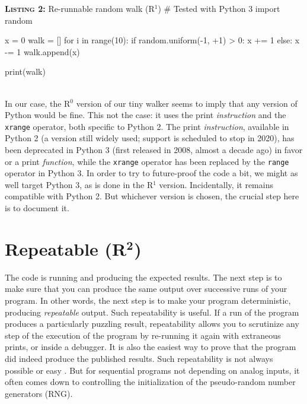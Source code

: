 \documentclass[a4paper,11pt]{article}
\begin{document}
\noindent \begin{minipage}[c]{\linewidth}
\begin{code}{\textbf{\textsc{Listing 2:}} Re-runnable random walk (R$^1$)}
# Tested with Python 3
import random

x =  0
walk = []
for i in range(10):
    if random.uniform(-1, +1) > 0:
        x += 1
    else:
        x -= 1
    walk.append(x)

print(walk)
\end{code}
\end{minipage}\\

In our case, the R$^0$ version of our tiny walker seems to imply that any version of Python would be fine. This not the case: it uses the print {\em instruction} and the {\tt xrange} operator, both specific to Python 2. The print {\em instruction}, available in Python 2 (a version still widely used; support is scheduled to stop in 2020), has been deprecated in Python 3 (first released in 2008, almost a decade ago) in favor or a  print {\em function}, while the {\tt xrange} operator has been replaced by the {\tt range} operator in Python 3. In order to try to future-proof the code a bit, we might as well target Python 3, as is done in the R$^1$ version. Incidentally, it remains compatible with Python 2. But whichever version is chosen, the crucial step here is to document it.


\section*{Repeatable (R$^{\mathbf 2}$)}

The code is running and producing the expected results. The next step is to make sure that you can produce the same output over successive runs of your program. In other words, the next step is to make your program deterministic, producing {\em repeatable} output. Such repeatability is useful. If a run of the program produces a particularly puzzling result, repeatability allows you to scrutinize any step of the execution of the program by re-running it again with extraneous prints, or inside a debugger. It is also the easiest way to prove that the program did indeed produce the published results. Such repeatability is not always possible or easy \citep{Diethelm:2012, Courtes:2015}. But for sequential programs not depending on analog inputs, it often comes down to controlling the initialization of the pseudo-random number generators (RNG).\\
\end{document}
